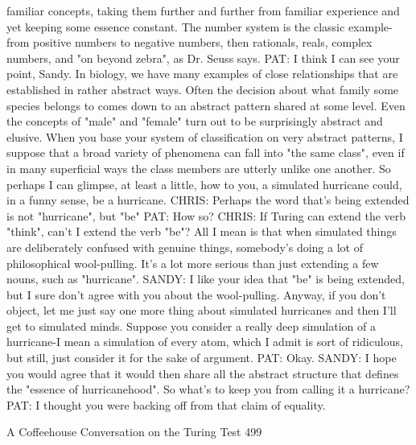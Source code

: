    familiar concepts, taking them further and further from familiar experience and
   yet keeping some essence constant. The number system is the classic example-
   from positive numbers to negative numbers, then rationals, reals, complex
   numbers, and "on beyond zebra", as Dr. Seuss says.
PAT: I think I can see your point, Sandy. In biology, we have many examples of close
   relationships that are established in rather abstract ways. Often the decision about
   what family some species belongs to comes down to an abstract pattern shared at
   some level. Even the concepts of "male" and "female" turn out to be surprisingly
   abstract and elusive. When you base your system of classification on very
   abstract patterns, I suppose that a broad variety of phenomena can fall into "the
   same class", even if in many superficial ways the class members are utterly
   unlike one another. So perhaps I can glimpse, at least a little, how to you, a
   simulated hurricane could, in a funny sense, be a hurricane.
CHRIS: Perhaps the word that's being extended is not "hurricane", but "be"
PAT: How so?
CHRIS: If Turing can extend the verb "think", can't I extend the verb "be"? All I mean
   is that when simulated things are deliberately confused with genuine things,
   somebody's doing a lot of philosophical wool-pulling. It's a lot more serious than
   just extending a few nouns, such as "hurricane".
SANDY: I like your idea that "be" is being extended, but I sure don't agree with you
   about the wool-pulling. Anyway, if you don't object, let me just say one more
   thing about simulated hurricanes and then I'll get to simulated minds. Suppose
   you consider a really deep simulation of a hurricane-I mean a simulation of every
   atom, which I admit is sort of ridiculous, but still, just consider it for the sake of
   argument.
PAT: Okay.
SANDY: I hope you would agree that it would then share all the abstract structure
   that defines the "essence of hurricanehood". So what's to keep you from calling it
   a hurricane?
PAT: I thought you were backing off from that claim of equality.




A Coffeehouse Conversation on the Turing Test                                        499

